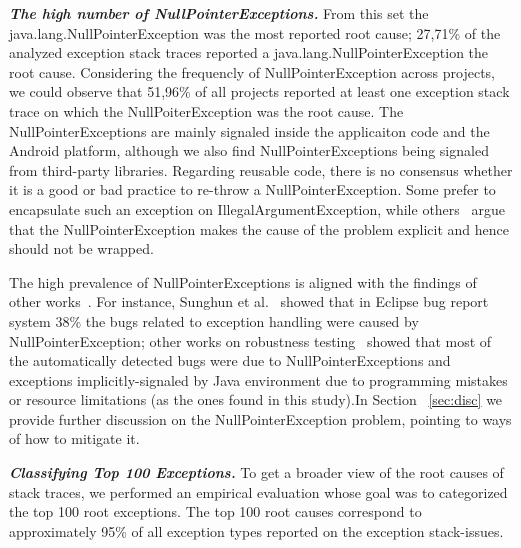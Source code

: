 \documentclass[conference]{IEEEtran}
\begin{document}
\emph{\textbf{The high number of NullPointerExceptions.}}
From this set the java.lang.NullPointerException was the most reported root cause; 27,71\% 
of the analyzed exception stack traces reported a java.lang.NullPointerException the root cause. 
Considering the frequencly of NullPointerException across projects, we could observe that
 51,96\% of all projects reported at least one exception stack trace on which the NullPoiterException
was the root cause.
 The NullPointerExceptions are mainly signaled inside the applicaiton code and the Android platform,
 although we also find NullPointerExceptions being signaled from third-party libraries. Regarding
reusable code, there is no consensus whether it is a good or bad practice to 
re-throw a NullPointerException. Some prefer to encapsulate such an exception on
IllegalArgumentException, while others~\cite{bloch2008effective} argue that the
NullPointerException makes the cause of the problem explicit and hence 
should not be wrapped.

The high prevalence of NullPointerExceptions is aligned with the findings of other 
works~\cite{kim2013predicting,fraser20131600,csallner2004jcrasher}. For instance, Sunghun et
al.~\cite{kim2013predicting} showed that in Eclipse bug report system 38\% the bugs 
related to exception handling were caused by NullPointerException; other works on robustness 
testing~\cite{maji2012empirical,csallner2004jcrasher} showed that most of the automatically 
detected bugs were due to NullPointerExceptions 
and exceptions implicitly-signaled by Java environment due to programming mistakes or resource limitations
 (as the ones found in this study).In Section ~\ref{sec:disc}  we provide further 
discussion on the NullPointerException problem, pointing 
to ways of how to mitigate it.


\emph{\textbf{Classifying Top 100 Exceptions.}} To get a broader view of the root causes of stack traces,
 we performed an empirical evaluation
whose goal was to categorized the top 100 root exceptions. The top 100 root causes correspond 
to approximately 95\% of all exception types reported on the exception stack-issues. 
\end{document}
